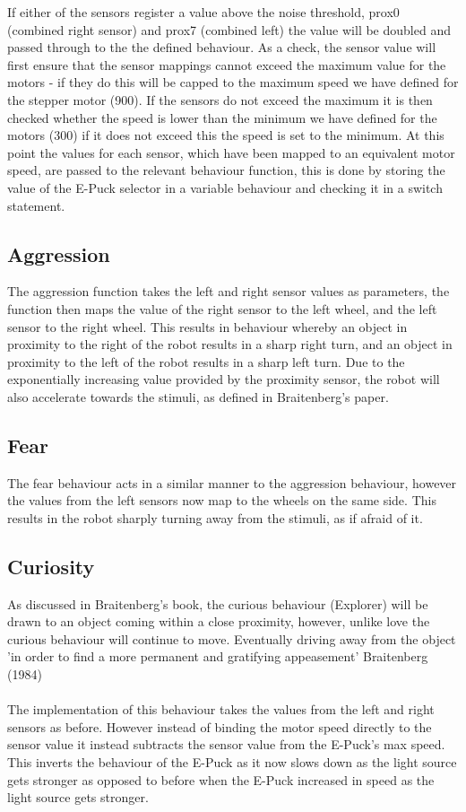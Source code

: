 \documentclass[11pt]{article}
\begin{document}
If either of the sensors register a value above the noise threshold, prox0 (combined right sensor) and prox7 (combined left) the value will be doubled and passed through to the the defined behaviour. As a check, the sensor value will first ensure that the sensor mappings cannot exceed the maximum value for the motors - if they do this will be capped to the maximum speed we have defined for the stepper motor (900). If the sensors do not exceed the maximum it is then checked whether the speed is lower than the minimum we have defined for the motors (300) if it does not exceed this the speed is set to the minimum. At this point the values for each sensor, which have been mapped to an equivalent motor speed, are passed to the relevant behaviour function, this is done by storing the value of the E-Puck selector in a variable behaviour and checking it in a switch statement.

\subsection*{Aggression}

The aggression function takes the left and right sensor values as parameters, the function then maps the value of the right sensor to the left wheel, and the left sensor to the right wheel. This results in behaviour whereby an object in proximity to the right of the robot results in a sharp right turn, and an object in proximity to the left of the robot results in a sharp left turn. Due to the exponentially increasing value provided by the proximity sensor, the robot will also accelerate towards the stimuli, as defined in Braitenberg’s paper.

\subsection*{Fear}

The fear behaviour acts in a similar manner to the aggression behaviour, however the values from the left sensors now map to the wheels on the same side. This results in the robot sharply turning away from the stimuli, as if afraid of it.

\subsection*{Curiosity }

As discussed in Braitenberg’s book, the curious behaviour (Explorer) will be drawn to an object coming within a close proximity, however, unlike love the curious behaviour will continue to move. Eventually driving away from the object 'in order to find a more permanent and gratifying appeasement' Braitenberg (1984)
\\
\\
The implementation of this behaviour takes the values from the left and right sensors as before. However instead of binding the motor speed directly to the sensor value it instead subtracts the sensor value from the E-Puck’s max speed. This inverts the behaviour of the E-Puck as it now slows down as the light source gets stronger as opposed to before when the E-Puck increased in speed as the light source gets stronger.
\end{document}
